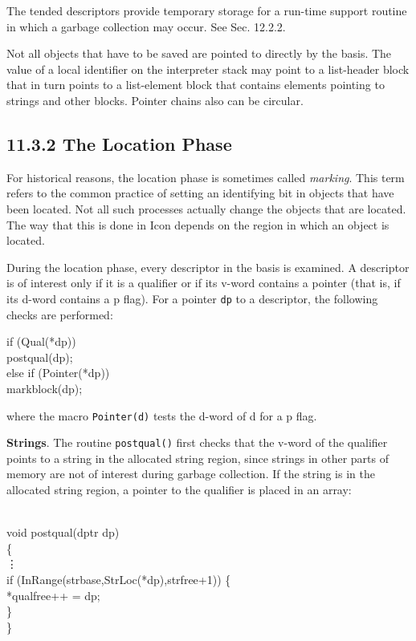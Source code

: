 The tended descriptors provide temporary storage for a run-time
support routine in which a garbage collection may occur. See Sec. 12.2.2.

Not all objects that have to be saved are pointed to directly by the
basis. The value of a local identifier on the interpreter stack may
point to a list-header block that in turn points to a list-element
block that contains elements pointing to strings and other
blocks. Pointer chains also can be circular.

\subsection[11.3.2 The Location Phase]{11.3.2 The Location Phase}

For historical reasons, the location phase is sometimes called
\textit{marking}. This term refers to the common practice of setting
an identifying bit in objects that have been located. Not all such
processes actually change the objects that are located. The way that
this is done in Icon depends on the region in which an object is
located.

During the location phase, every descriptor in the basis is
examined. A descriptor is of interest only if it is a qualifier or if
its v-word contains a pointer (that is, if its d-word contains a p
flag). For a pointer \texttt{dp} to a descriptor, the following checks
are performed:

\begin{iconcode}
\>if (Qual(*dp))\\
\>\>postqual(dp);\\
\>else if (Pointer(*dp))\\
\>\>markblock(dp);
\end{iconcode}


\noindent
where the macro \texttt{Pointer(d)} tests the d-word of d for a p flag.

\textbf{Strings}. The routine \texttt{postqual()} first checks that
the v-word of the qualifier points to a string in the allocated string
region, since strings in other parts of memory are not of interest
during garbage collection. If the string is in the allocated string
region, a pointer to the qualifier is placed in an array:

\begin{iconcode}\\
\>void postqual(dptr dp)\\
\>\{\\
\>\>\>\vdots\\
\>if (InRange(strbase,StrLoc(*dp),strfree+1)) \{\\
\>\>*qualfree++ = dp;\\
\>\>\}\\
\>\}
\end{iconcode}



